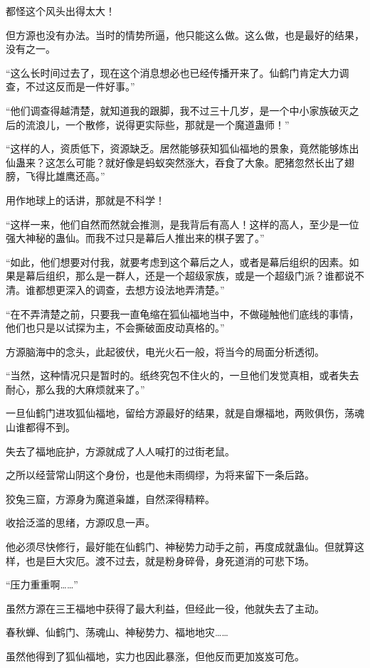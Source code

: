 \begin{this_body}
都怪这个风头出得太大！

但方源也没有办法。当时的情势所逼，他只能这么做。这么做，也是最好的结果，没有之一。

“这么长时间过去了，现在这个消息想必也已经传播开来了。仙鹤门肯定大力调查，不过这反而是一件好事。”

“他们调查得越清楚，就知道我的跟脚，我不过三十几岁，是一个中小家族破灭之后的流浪儿，一个散修，说得更实际些，那就是一个魔道蛊师！”

“这样的人，资质低下，资源缺乏。居然能够获知狐仙福地的景象，竟然能够炼出仙蛊来？这怎么可能？就好像是蚂蚁突然涨大，吞食了大象。肥猪忽然长出了翅膀，飞得比雄鹰还高。”

用作地球上的话讲，那就是不科学！

“这样一来，他们自然而然就会推测，是我背后有高人！这样的高人，至少是一位强大神秘的蛊仙。而我不过只是幕后人推出来的棋子罢了。”

“如此，他们想要对付我，就要考虑到这个幕后之人，或者是幕后组织的因素。如果是幕后组织，那么是一群人，还是一个超级家族，或是一个超级门派？谁都说不清。谁都想更深入的调查，去想方设法地弄清楚。”

“在不弄清楚之前，只要我一直龟缩在狐仙福地当中，不做碰触他们底线的事情，他们也只是以试探为主，不会撕破面皮动真格的。”

方源脑海中的念头，此起彼伏，电光火石一般，将当今的局面分析透彻。

“当然，这种情况只是暂时的。纸终究包不住火的，一旦他们发觉真相，或者失去耐心，那么我的大麻烦就来了。”

一旦仙鹤门进攻狐仙福地，留给方源最好的结果，就是自爆福地，两败俱伤，荡魂山谁都得不到。

失去了福地庇护，方源就成了人人喊打的过街老鼠。

之所以经营常山阴这个身份，也是他未雨绸缪，为将来留下一条后路。

狡兔三窟，方源身为魔道枭雄，自然深得精粹。

收拾泛滥的思绪，方源叹息一声。

他必须尽快修行，最好能在仙鹤门、神秘势力动手之前，再度成就蛊仙。但就算这样，也是巨大灾厄。渡不过去，就是粉身碎骨，身死道消的可悲下场。

“压力重重啊……”

虽然方源在三王福地中获得了最大利益，但经此一役，他就失去了主动。

春秋蝉、仙鹤门、荡魂山、神秘势力、福地地灾……

虽然他得到了狐仙福地，实力也因此暴涨，但他反而更加岌岌可危。


\end{this_body}
